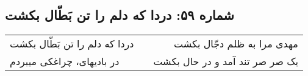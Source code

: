 \begin{center}
\section*{شماره ۵۹: دردا که دلم را تن بَطّال بکشت}
\label{sec:059}
\begin{longtable}{l p{0.5cm} r}
دردا که دلم را تن بَطّال بکشت
&&
مهدی مرا به ظلم دجّال بکشت
\\
در بادیهای، چراغکی میبردم
&&
یک صر صر تند آمد و در حال بکشت
\\
\end{longtable}
\end{center}
